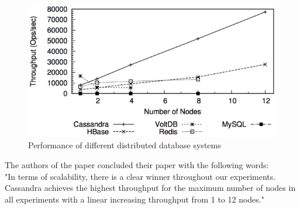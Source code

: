 \documentclass[a4paper]{article}
\begin{document}
\begin{figure}[h!]
	\centering
	\includegraphics[scale=0.5]{images/throughputCassandra.png}
	\caption{Performance of different distributed database systems}
	\label{throughput_cassandra}
\end{figure}

The authors of the paper concluded their paper with the following words:\\

"In terms of scalability, there is a clear winner throughout our experiments. Cassandra achieves the highest throughput for the maximum number of nodes in all experiments with a linear increasing throughput from 1 to 12 nodes."
\end{document}
